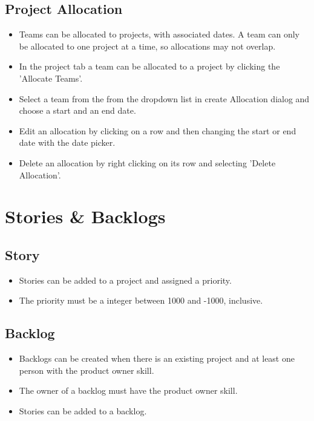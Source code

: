 \documentclass[11pt,fleqn]{book} %
\begin{document}
\begin{enumerate}
\subsection{Project Allocation}
\begin{itemize}
  \item Teams can be allocated to projects, with associated dates.
    A team can only be allocated to one project at a time, so allocations may not overlap.
  \item In the project tab a team can be allocated to a project by clicking the 'Allocate Teams'.
  \item Select a team from the from the dropdown list in create Allocation dialog and choose a start and an end date.
  \item Edit an allocation by clicking on a row and then changing the start or end date with the date picker.
  \item Delete an allocation by right clicking on its row and selecting 'Delete Allocation'.
\end{itemize}
\section{Stories \& Backlogs}

\subsection{Story}
\begin{itemize}
  \item Stories can be added to a project and assigned a priority.
  \item The priority must be a integer between 1000 and -1000, inclusive.
\end{itemize}

\subsection{Backlog}

\begin{itemize}
\item Backlogs can be created when there is an existing project and at least one person with the product owner skill.
\item The owner of a backlog must have the product owner skill. 
\item Stories can be added to a backlog.
\end{itemize}


\end{enumerate}
\end{document}
